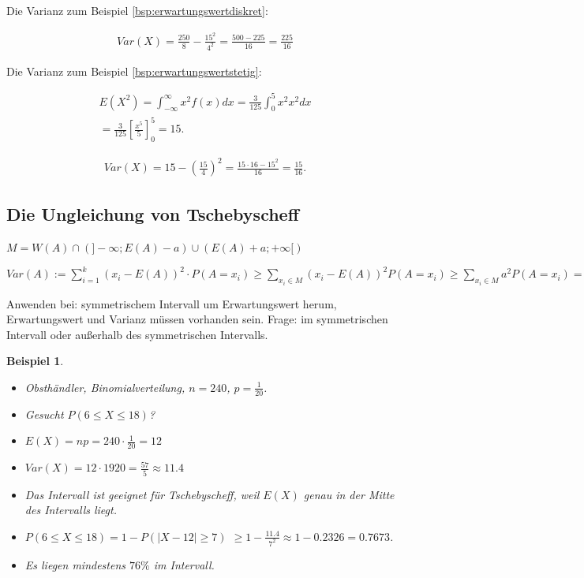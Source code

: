 \documentclass{tufte-handout}
\theoremstyle{own}
\newtheorem{example}{Beispiel}[]
\begin{document}
Die Varianz zum Beispiel \autoref{bsp:erwartungswertdiskret}:

\begin{gather*}
Var(X) = \frac{250}{8} - \frac{15^2}{4^2} = \frac{500-225}{16} = \frac{225}{16}
\end{gather*}

Die Varianz zum Beispiel \autoref{bsp:erwartungswertstetig}:

\begin{gather*}
E(X^2) = \int_{-\infty}^\infty x^2 f(x) dx = \frac{3}{125} \int_0^5 x^2 x^2 dx \\
= \frac{3}{125} [\frac{x^5}{5}]_0^5 = 15.
\end{gather*}

\begin{gather*}
Var(X) = 15 - (\frac{15}{4})^2 = \frac{15 \cdot 16 - 15^2}{16} = \frac{15}{16}.
\end{gather*}

\subsection{Die Ungleichung von Tschebyscheff}

$M = W(A) \cap (]-\infty; E(A) - a) \cup (E(A)+a; +\infty [)$

$Var(A) := \sum_{i=1}^k (x_i - E(A))^2 \cdot P(A = x_i) \ge \sum_{x_i \in M}
(x_i - E(A))^2 P(A=x_i) \ge \sum_{x_i \in M} a^2 P(A=x_i) = a^2 \sum_{x_i \in M}
P(A = x_i) = P(|A - E(A)| \ge a)$

Anwenden bei: symmetrischem Intervall um Erwartungswert herum, Erwartungswert
und Varianz müssen vorhanden sein. Frage: im symmetrischen Intervall oder
außerhalb des symmetrischen Intervalls.

\begin{example}
	\begin{itemize}
		\item Obsthändler, Binomialverteilung, $n=240$, $p=\frac{1}{20}$.
		\item Gesucht $P(6 \le X \le 18)$?
		\item $E(X) = np = 240 \cdot \frac{1}{20} = 12$
		\item $Var(X) = 12 \cdot {19}{20} = \frac{57}{5} \approx 11.4$
		\item Das Intervall ist geeignet für Tschebyscheff, weil $E(X)$ genau in der Mitte
		des Intervalls liegt.
		\item $P(6 \le X \le 18) = 1 - P(|X - 12| \ge 7)$
		$\ge 1 - \frac{11.4}{7^2} \approx 1 - 0.2326 = 0.7673$.
		\item Es liegen \emph{mindestens} $76\%$ im Intervall.
	\end{itemize}
\end{example}
\end{document}
